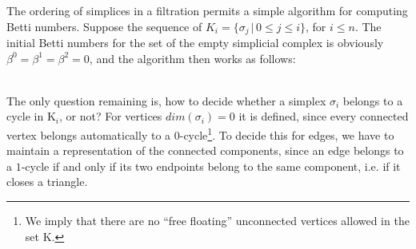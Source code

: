 The ordering of simplices in a filtration permits a simple algorithm for computing Betti numbers.
Suppose the sequence of $K_{i} = \{ \sigma_{j} \,|\, 0 \leq j \leq i \}$, for $i \leq n$.
The initial Betti numbers for the set of the empty simplicial complex is obviously $\beta^{0} = \beta^{1} = \beta^{2} = 0$, and the algorithm then works as follows:
\begin{table}[htb] \bigskip \centering
\setlength{\tabcolsep}{5pt}
\renewcommand{\arraystretch}{1.10}
	\medskip
	\caption{Algorithm -- Betti numbers of simplicial complexes.}
	\label{algo:betti_numbers}
\end{table}\\
The only question remaining is, how to decide whether a simplex $\sigma_{i}$ belongs to a cycle in $\mathrm{K}_{i}$, or not? 
For vertices $dim(\sigma_{i}) = 0$ it is defined, since every connected vertex belongs automatically to a $0$-cycle\footnote{ We imply that there are no ``free floating'' unconnected vertices allowed in the set $\mathrm{K}$.}.
To decide this for edges, we have to maintain a representation of the connected components, since an edge belongs to a $1$-cycle if and only if its two endpoints belong to the same component, i.e. if it closes a triangle.
